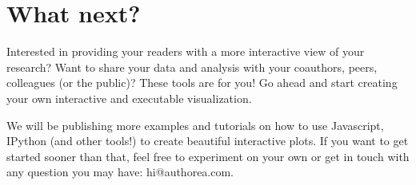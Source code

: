 \section{What next?}

Interested in providing your readers with a more interactive view of your research? Want to share your data and analysis with your coauthors, peers, colleagues (or the public)? These tools are for you! Go ahead and start creating your own interactive and executable visualization.

We will be publishing more examples and tutorials on how to use Javascript, IPython (and other tools!) to create beautiful interactive plots. If you want to get started sooner than that, feel free to experiment on your own or get in touch with any question you may have: hi@authorea.com. 